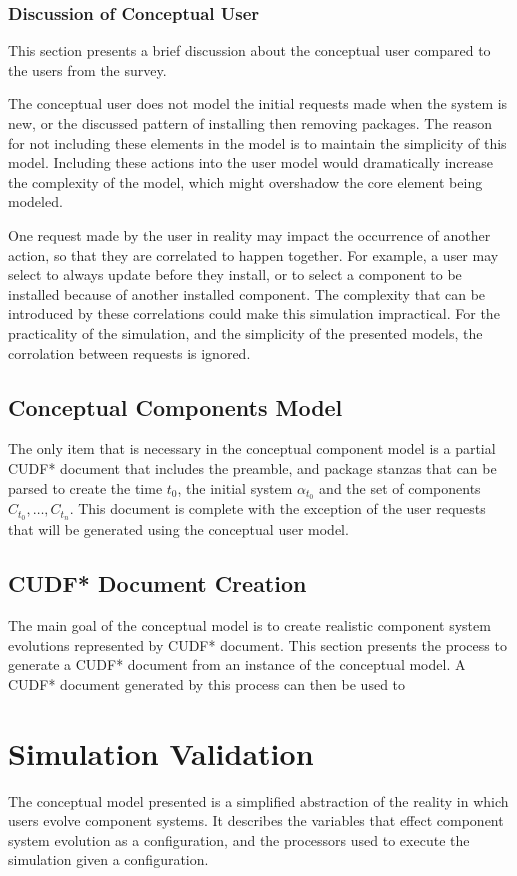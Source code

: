 \subsubsection{Discussion of Conceptual User}
This section presents a brief discussion about the conceptual user compared to the users from the survey.

The conceptual user does not model the initial requests made when the system is new, 
or the discussed pattern of installing then removing packages.
The reason for not including these elements in the model is to maintain the simplicity of this model.
Including these actions into the user model would dramatically increase the complexity of the model, 
which might overshadow the core element being modeled. 

One request made by the user in reality may impact the occurrence of another action, so that they are correlated to happen together.
For example, a user may select to always update before they install, or to select a component to be installed because of another installed component.
The complexity that can be introduced by these correlations could make this simulation impractical.
For the practicality of the simulation, and the simplicity of the presented models, the corrolation between requests is ignored.

\subsection{Conceptual Components Model}
The only item that is necessary in the conceptual component model is 
a partial CUDF* document that includes the preamble, and package stanzas that can be parsed to create the time $t_0$, the initial system $\alpha_{t_0}$ and the set of components $C_{t_0},\ldots,C_{t_n}$.
This document is complete with the exception of the user requests that will be generated using the conceptual user model.


\subsection{CUDF* Document Creation}
The main goal of the conceptual model is to create realistic component system evolutions represented by CUDF* document.
This section presents the process to generate a CUDF* document from an instance of the conceptual model. 
A CUDF* document generated by this process can then be used to 


\section{Simulation Validation}
The conceptual model presented is a simplified abstraction of the reality in which users evolve component systems.
It describes the variables that effect component system evolution as a configuration,
and the processors used to execute the simulation given a configuration.

